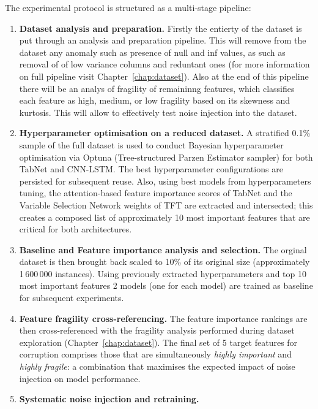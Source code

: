 \documentclass[../main.tex]{subfiles}
\begin{document}
The experimental protocol is structured as a multi-stage pipeline:
\begin{enumerate}
    \item  \textbf{Dataset analysis and preparation.} Firstly the entierty of the dataset  is put through an analysis and preparation pipeline. This will remove from the dataset any anomaly such as presence of null and inf values, as such as removal of 
        of low variance columns and reduntant ones (for more information on full pipeline visit Chapter~\ref{chap:dataset}). Also at the end of this pipeline there will be 
        an analys of fragility of remaininng features,  which classifies each feature as high,
        medium, or low fragility based on its skewness and kurtosis. This will allow 
        to effectively test noise injection into the dataset. 
    \item \textbf{Hyperparameter optimisation on a reduced dataset.}
        A stratified 0.1\% sample of the full dataset is used to conduct
        Bayesian hyperparameter optimisation via Optuna
        (Tree-structured Parzen Estimator sampler) for both TabNet and CNN-LSTM.
        The best hyperparameter configurations are persisted for subsequent
        reuse. Also, using best models from hyperparameters tuning, the attention-based feature importance scores of TabNet and the Variable Selection Network weights of TFT are extracted and intersected; this creates a composed list of approximately 10 most important features that are critical for both architectures.
    \item \textbf{Baseline and Feature importance analysis and selection.}
        The orginal dataset is then brought back scaled to 10\% of its original size (approximately
        1\,600\,000 instances). Using previously extracted hyperparameters and top 10 most
        important features 2 models (one for each model) are trained as baseline for subsequent
        experiments.
    \item \textbf{Feature fragility cross-referencing.}
          The feature importance rankings are then cross-referenced with the
          fragility analysis performed during dataset exploration
          (Chapter~\ref{chap:dataset}).  
          The final set of 5 target features for corruption comprises those that are
          simultaneously \emph{highly important} and \emph{highly fragile}: a
          combination that maximises the expected impact of noise injection on
          model performance.
    \item \textbf{Systematic noise injection and retraining.}

\end{enumerate}
\end{document}
